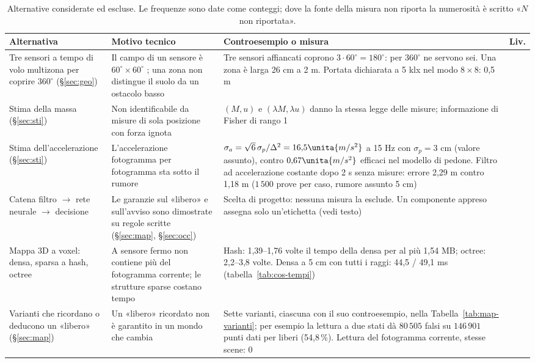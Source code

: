 \begin{table}[H]\centering\footnotesize
\caption{Alternative considerate ed escluse. Le frequenze sono date come conteggi; dove la fonte della misura non riporta la numerosità è scritto «$N$ non riportata».}\label{tab:cos-alternative}
\begin{tabularx}{\textwidth}{@{}>{\RaggedRight\arraybackslash}p{3.3cm}>{\RaggedRight\arraybackslash}p{4.4cm}Lc@{}}\toprule
Alternativa & Motivo tecnico & Controesempio o misura & Liv.\\\midrule
Tre sensori a tempo di volo multizona per coprire $360^\circ$ (\S\ref{sec:geo}) & Il campo di un sensore è $60^\circ\times60^\circ$ \cite{st-vl53l7cx}; una zona non distingue il suolo da un ostacolo basso & Tre sensori affiancati coprono $3\cdot60^\circ=180^\circ$: per $360^\circ$ ne servono sei. Una zona è larga 26 cm a 2 m. Portata dichiarata a 5 klx nel modo $8\times8$: 0,5 m \cite{st-vl53l7cx} & \\
Stima della massa (\S\ref{sec:sti}) & Non identificabile da misure di sola posizione con forza ignota & $(M,u)$ e $(\lambda M,\lambda u)$ danno la stessa legge delle misure; informazione di Fisher di rango 1 & \\
Stima dell'accelerazione (\S\ref{sec:sti}) & L'accelerazione fotogramma per fotogramma sta sotto il rumore & $\sigma_a=\sqrt6\,\sigma_p/\Delta^2=16{,}5\unita{m/s^2}$ a 15 Hz con $\sigma_p=3$ cm (valore assunto), contro $0{,}67\unita{m/s^2}$ efficaci nel modello di pedone. Filtro ad accelerazione costante dopo 2 s senza misure: errore 2,29 m contro 1,18 m ($1\,500$ prove per caso, rumore assunto 5 cm) &  \\
Catena filtro $\to$ rete neurale $\to$ decisione & Le garanzie sul «libero» e sull'avviso sono dimostrate su regole scritte (\S\ref{sec:map}, \S\ref{sec:occ}) & Scelta di progetto: nessuna misura la esclude. Un componente appreso assegna solo un'etichetta (vedi testo) & \\
Mappa 3D a voxel: densa, sparsa a hash, octree & A sensore fermo non contiene più del fotogramma corrente; le strutture sparse costano tempo & Hash: 1,39--1,76 volte il tempo della densa per al più 1,54 MB; octree: 2,2--3,8 volte. Densa a 5 cm con tutti i raggi: 44,5 / 49,1 ms (tabella~\ref{tab:cos-tempi}) & \\
Varianti che ricordano o deducono un «libero» (\S\ref{sec:map}) & Un «libero» ricordato non è garantito in un mondo che cambia & Sette varianti, ciascuna con il suo controesempio, nella Tabella~\ref{tab:map-varianti}; per esempio la lettura a due stati dà $80\,505$ falsi su $146\,901$ punti dati per liberi (54,8\,\%). Lettura del fotogramma corrente, stesse scene: 0 & \\

\end{tabularx}
\end{table}
